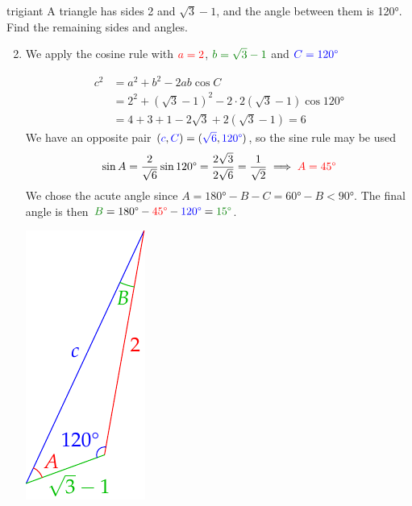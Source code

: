 \begin{examples}{}{trigiant}
	\exstart A triangle has sides 2 and $\sqrt 3-1$, and the angle between them is \ang{120}. Find the remaining sides and angles.%
	\begin{enumerate}\setcounter{enumi}{1}
		\item[] We apply the cosine rule with $\textcolor{red}{a=2}$, $\textcolor{Green}{b=\sqrt 3-1}$ and $\textcolor{blue}{C=\ang{120}}$\par
		\begin{minipage}[t]{0.79\linewidth}\vspace{-20pt}
		  \begin{align*}
		    c^2&=a^2+b^2-2ab\cos C\\
		    &=2^2+(\sqrt 3-1)^2-2\cdot 2(\sqrt 3-1)\cos\ang{120} \\
		    &=4+3+1-2\sqrt 3+2(\sqrt 3-1) =6
		  \end{align*}
		  We have an opposite pair $(\textcolor{blue}{c},\textcolor{blue}{C})=(\textcolor{blue}{\sqrt 6},\textcolor{blue}{\ang{120}})$, so the sine rule may be used
		  \[
		  	\sin A=\frac 2{\sqrt 6}\sin\ang{120}=\frac{2\sqrt 3}{2\sqrt 6}=\frac 1{\sqrt 2}\implies \textcolor{red}{A=\ang{45}}
		  \]
		  We chose the acute angle since $A=\ang{180}-B-C=\ang{60}-B<\ang{90}$.\smallbreak
		  The final angle is then $\textcolor{Green}{B}=\ang{180}-\textcolor{red}{\ang{45}}-\textcolor{blue}{\ang{120}}=\textcolor{Green}{\ang{15}}$.
		\end{minipage}
		\hfill
		\begin{minipage}[t]{0.2\linewidth}\vspace{-28pt}
			\flushright\includegraphics{exsas}
		\end{minipage}\smallbreak
		

\end{enumerate}
\end{examples}

